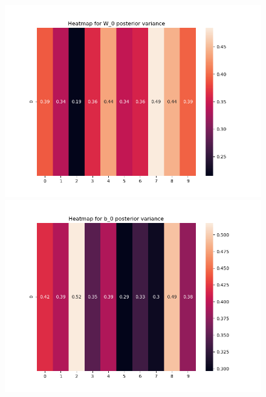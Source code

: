 \documentclass[10pt]{homeworg}
\begin{document}
\begin{figure}[!htbp]
    \centering
    \begin{minipage}{0.45\textwidth}
        \centering
       \includegraphics[scale=0.5]{figures/heatmap_var_W_0.png}
    \end{minipage}\hfill
    \begin{minipage}{0.45\textwidth}
        \centering
        \includegraphics[scale=0.5]{figures/heatmap_var_b_0.png}
    \end{minipage}
\end{figure}
\end{document}
